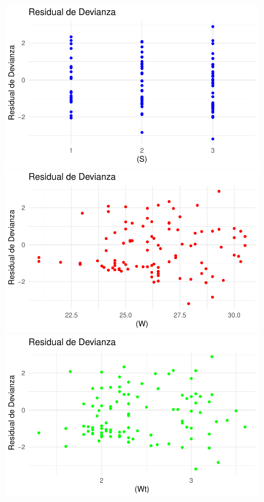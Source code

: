 \documentclass[
  letterpaper,
  DIV=11,
  numbers=noendperiod]{scrartcl}
\begin{document}
\begin{figure}

\begin{minipage}{0.50\linewidth}
\includegraphics{Modelos_files/figure-pdf/unnamed-chunk-32-1.pdf}\end{minipage}%
%
\begin{minipage}{0.50\linewidth}
\includegraphics{Modelos_files/figure-pdf/unnamed-chunk-32-2.pdf}\end{minipage}%
\newline
\begin{minipage}{0.50\linewidth}
\includegraphics{Modelos_files/figure-pdf/unnamed-chunk-32-3.pdf}\end{minipage}%

\end{figure}
\end{document}
